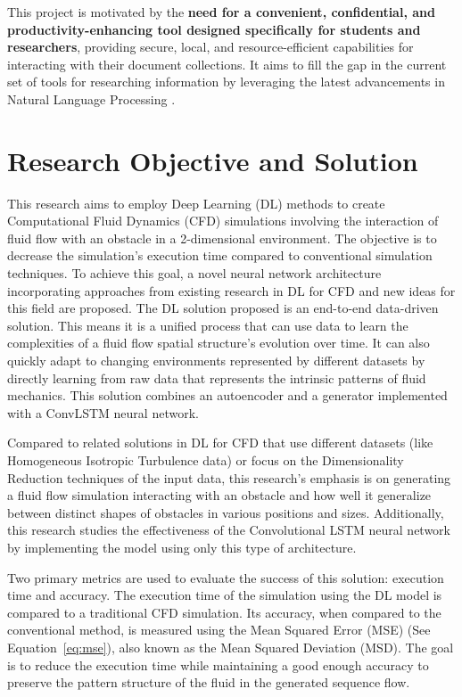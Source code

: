 This project is motivated by the \textbf{need for a convenient, confidential, and productivity-enhancing tool designed specifically for students and researchers}, providing secure, local, and resource-efficient capabilities for interacting with their document collections. It aims to fill the gap in the current set of tools for researching information by leveraging the latest advancements in Natural Language Processing \cite{brown2020language, raffel2020exploring}.
\section{Research Objective and Solution}
\label{sec:ResearchObjectiveandSolution}
This research aims to employ Deep Learning (DL) methods to create Computational Fluid Dynamics (CFD) simulations involving the interaction of fluid flow with an obstacle in a 2-dimensional environment. The objective is to decrease the simulation's execution time compared to conventional simulation techniques. To achieve this goal, a novel neural network architecture incorporating approaches from existing research in DL for CFD and new ideas for this field are proposed. The DL solution proposed is an end-to-end data-driven solution. This means it is a unified process that can use data to learn the complexities of a fluid flow spatial structure's evolution over time. It can also quickly adapt to changing environments represented by different datasets by directly learning from raw data that represents the intrinsic patterns of fluid mechanics. This solution combines an autoencoder and a generator implemented with a ConvLSTM neural network.

Compared to related solutions in DL for CFD that use different datasets (like Homogeneous Isotropic Turbulence data) or focus on the Dimensionality Reduction techniques of the input data, this research's emphasis is on generating a fluid flow simulation interacting with an obstacle and how well it generalize between distinct shapes of obstacles in various positions and sizes. Additionally, this research studies the effectiveness of the Convolutional LSTM neural network by implementing the model using only this type of architecture.

Two primary metrics are used to evaluate the success of this solution: execution time and accuracy. The execution time of the simulation using the DL model is compared to a traditional CFD simulation. Its accuracy, when compared to the conventional method, is measured using the Mean Squared Error (MSE) (See Equation~\ref{eq:mse}), also known as the Mean Squared Deviation (MSD). The goal is to reduce the execution time while maintaining a good enough accuracy to preserve the pattern structure of the fluid in the generated sequence flow.

